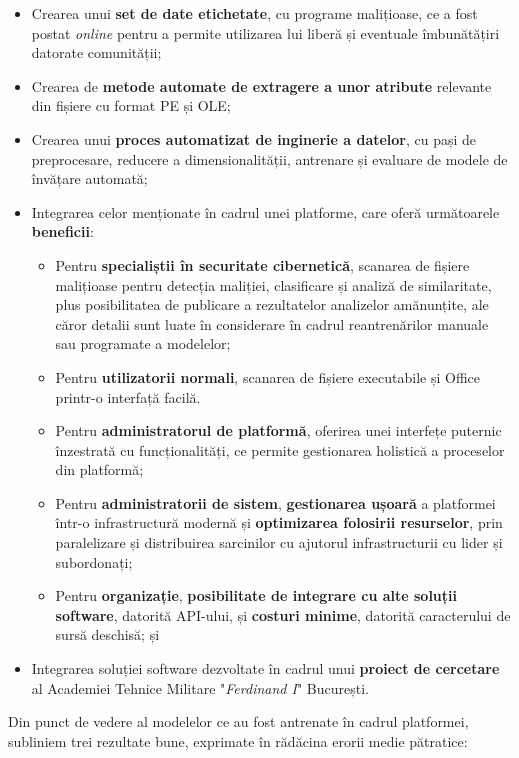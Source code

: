 \documentclass[../../main.tex]{subfiles}
\begin{document}
\begin{itemize}
    \item Crearea unui \textbf{set de date etichetate}, cu programe malițioase, ce a fost postat \textit{online} pentru a permite utilizarea lui liberă și eventuale îmbunătă\-țiri datorate comunității;
    \item Crearea de \textbf{metode automate de extragere a unor atribute} relevante din fișiere cu format PE și OLE;
    \item Crearea unui \textbf{proces automatizat de inginerie a datelor}, cu pași de preprocesare, reducere a dimensionalității, antrenare și evaluare de modele de învățare automată;
    \item Integrarea celor menționate în cadrul unei platforme, care oferă următoare\-le \textbf{beneficii}:
    \begin{itemize}
        \item Pentru \textbf{specialiștii în securitate cibernetică}, scanarea de fișiere malițioase pentru detecția maliției, clasificare și analiză de similaritate, plus posibilitatea de publicare a rezultatelor analizelor amănun\-țite, ale căror detalii sunt luate în considerare în cadrul reantrenărilor manuale sau programate a modelelor;
        \item Pentru \textbf{utilizatorii normali}, scanarea de fișiere executabile și Office printr-o interfață facilă.
        \item Pentru \textbf{administratorul de platformă}, oferirea unei interfețe pu\-ternic înzestrată cu funcționalități, ce permite gestionarea holistică a proceselor din platformă;
        \item Pentru \textbf{administratorii de sistem}, \textbf{gestionarea ușoară} a platformei într-o infrastructură modernă și \textbf{optimizarea folosirii resur\-selor}, prin paralelizare și distribuirea sarcinilor cu ajutorul infrastructurii cu lider și subordonați;
        \item Pentru \textbf{organizație}, \textbf{posibilitate de integrare cu alte soluții software}, datorită API-ului, și \textbf{costuri minime}, datorită caracterului de sursă deschisă; și
    \end{itemize}
    \item Integrarea soluției software dezvoltate în cadrul unui \textbf{proiect de cer\-cetare} al Academiei Tehnice Militare "\textit{Ferdinand I}" București.
\end{itemize}

Din punct de vedere al modelelor ce au fost antrenate în cadrul platformei, subliniem trei rezultate bune, exprimate în rădăcina erorii medie pătratice:
\end{document}
